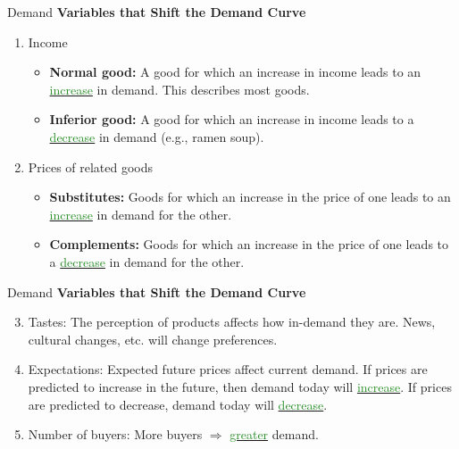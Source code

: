 \documentclass[xcolor={dvipsnames},pdf, hyperref={colorlinks=true, citecolor=ForestGreen, linkcolor=BlueViolet, urlcolor=Magenta}]{beamer}
\theoremstyle{definition}
\newcommand{\defn}[1]{\textbf{#1}}
\newcommand{\dd}[1]{{\underline{\textcolor{ForestGreen}{#1}}}}
\begin{document}
\begin{frame}{Demand}
	\textbf{Variables that Shift the Demand Curve}
			\begin{enumerate}
				\item Income

			
			\begin{itemize}
				\item \defn{Normal good:} A good for which an increase in income leads to an \dd{increase} in demand. This describes most goods.
				\item \defn{Inferior good:} A good for which an increase in income leads to a \dd{decrease} in demand (e.g., ramen soup).
			\end{itemize}

			\item Prices of related goods
		\begin{itemize}
			\item \defn{Substitutes:} Goods for which an increase in the price of one leads to an \dd{increase} in demand for the other.
			\item \defn{Complements:} Goods for which an increase in the price of one leads to a \dd{decrease} in demand for the other.
		\end{itemize}
	
		\end{enumerate}
\end{frame}

	
\begin{frame}{Demand}
		\textbf{Variables that Shift the Demand Curve}
	\begin{enumerate}
		\setcounter{enumi}{2}	
		\item Tastes: The perception of products affects how in-demand they are. News, cultural changes, etc. will change preferences.
		\item Expectations: Expected future prices affect current demand. If prices are predicted to increase in the future, then demand today will \dd{increase}. If prices are predicted to decrease, demand today will \dd{decrease}.
		\item Number of buyers: More buyers $\Rightarrow$ \dd{greater} demand.
	\end{enumerate}
\end{frame}
\end{document}
